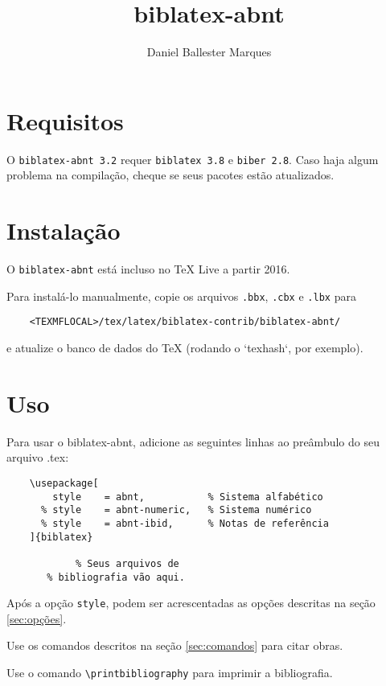 \documentclass[a4paper]{article}
\title{biblatex-abnt \version}
\author{Daniel Ballester Marques}
\newcommand{\version}{3.2}
\newcommand{\requirements}{\texttt{biblatex 3.8} e \texttt{biber 2.8}}
\begin{document}

\maketitle

\tableofcontents

\clearpage
\section{Requisitos}%

O \texttt{biblatex-abnt \version} requer \requirements. Caso haja algum
problema na compilação, cheque se seus pacotes estão atualizados.

\section{Instalação}%

O \texttt{biblatex-abnt} está incluso no TeX Live a partir 2016.

Para instalá-lo manualmente, copie os arquivos \texttt{.bbx}, \texttt{.cbx} e
\texttt{.lbx} para
\begin{verbatim}
    <TEXMFLOCAL>/tex/latex/biblatex-contrib/biblatex-abnt/
\end{verbatim}
e atualize o banco de dados do TeX (rodando o `texhash`, por exemplo).

\section{Uso}%

Para usar o {biblatex-abnt}, adicione as seguintes linhas ao preâmbulo do seu
arquivo {.tex}:

\begin{verbatim}
    \usepackage[
        style    = abnt,           % Sistema alfabético
      % style    = abnt-numeric,   % Sistema numérico
      % style    = abnt-ibid,      % Notas de referência
    ]{biblatex}

            % Seus arquivos de
       % bibliografia vão aqui.
\end{verbatim}

Após a opção \texttt{style}, podem ser acrescentadas
as opções descritas na seção \ref{sec:opções}.

Use os comandos descritos na seção \ref{sec:comandos} para citar obras.

Use o comando \verb"\printbibliography" para imprimir a bibliografia.
\end{document}
